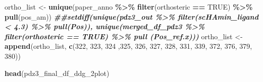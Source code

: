 \documentclass[
]{article}
\newenvironment{Shaded}{\begin{snugshade}}{\end{snugshade}}
\newcommand{\ConstantTok}[1]{\textcolor[rgb]{0.56,0.35,0.01}{#1}}
\newcommand{\DecValTok}[1]{\textcolor[rgb]{0.00,0.00,0.81}{#1}}
\newcommand{\DocumentationTok}[1]{\textcolor[rgb]{0.56,0.35,0.01}{\textbf{\textit{#1}}}}
\newcommand{\FunctionTok}[1]{\textcolor[rgb]{0.13,0.29,0.53}{\textbf{#1}}}
\newcommand{\NormalTok}[1]{#1}
\newcommand{\OtherTok}[1]{\textcolor[rgb]{0.56,0.35,0.01}{#1}}
\newcommand{\SpecialCharTok}[1]{\textcolor[rgb]{0.81,0.36,0.00}{\textbf{#1}}}
\begin{document}
\begin{Shaded}
\begin{Highlighting}[]
\NormalTok{ortho\_list }\OtherTok{\textless{}{-}} \FunctionTok{unique}\NormalTok{(paper\_anno }\SpecialCharTok{\%\textgreater{}\%} \FunctionTok{filter}\NormalTok{(orthosteric }\SpecialCharTok{==} \ConstantTok{TRUE}\NormalTok{) }\SpecialCharTok{\%\textgreater{}\%} \FunctionTok{pull}\NormalTok{(pos\_am))}
\DocumentationTok{\#\#setdiff(unique(pdz3\_out \%\textgreater{}\% filter(scHAmin\_ligand \textless{} 4.3) \%\textgreater{}\% pull(Pos)), unique(merged\_df\_pdz3 \%\textgreater{}\% filter(orthosteric == TRUE) \%\textgreater{}\% pull (Pos\_ref.x)))}
\NormalTok{ortho\_list }\OtherTok{\textless{}{-}} \FunctionTok{append}\NormalTok{(ortho\_list, }\FunctionTok{c}\NormalTok{(}\DecValTok{322}\NormalTok{, }\DecValTok{323}\NormalTok{, }\DecValTok{324}\NormalTok{ ,}\DecValTok{325}\NormalTok{, }\DecValTok{326}\NormalTok{, }\DecValTok{327}\NormalTok{, }\DecValTok{328}\NormalTok{, }\DecValTok{331}\NormalTok{, }\DecValTok{339}\NormalTok{, }\DecValTok{372}\NormalTok{, }\DecValTok{376}\NormalTok{, }\DecValTok{379}\NormalTok{, }\DecValTok{380}\NormalTok{))}

\FunctionTok{head}\NormalTok{(pdz3\_final\_df\_ddg\_2plot)}
\end{Highlighting}
\end{Shaded}
\end{document}
